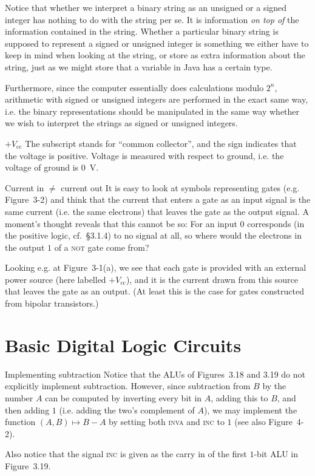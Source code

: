 \documentclass[article, a4paper, 11pt, oneside]{memoir}
\numberwithin{equation}{chapter}
\newcommand{\gate}{\textsc}
\newcommand{\gateNOT}{\gate{not}}
\newcounter{desccount}
\begin{document}
\begin{notelist}
Notice that whether we interpret a binary string as an unsigned or a signed integer has nothing to do with the string per se. It is information \emph{on top of} the information contained in the string. Whether a particular binary string is supposed to represent a signed or unsigned integer is something we either have to keep in mind when looking at the string, or store as extra information about the string, just as we might store that a variable in Java has a certain type.

Furthermore, since the computer essentially does calculations modulo $2^n$, arithmetic with signed or unsigned integers are performed in the exact same way, i.e. the binary representations should be manipulated in the same way whether we wish to interpret the strings as signed or unsigned integers.

\item[$+V_{\mathrm{cc}}$]
The subscript stands for \enquote{common collector}, and the sign indicates that the voltage is positive. Voltage is measured with respect to ground, i.e. the voltage of ground is \SI{0}{\volt}.

\item[Current in $\neq$ current out]\label{note:current-in-out} %
It is easy to look at symbols representing gates (e.g. Figure~3-2) and think that the current that enters a gate as an input signal is the same current (i.e. the same electrons) that leaves the gate as the output signal. A moment's thought reveals that this cannot be so: For an input $0$ corresponds (in the positive logic, cf.~§3.1.4) to no signal at all, so where would the electrons in the output $1$ of a \gateNOT{} gate come from?

Looking e.g. at Figure~3-1(a), we see that each gate is provided with an external power source (here labelled $+V_{\mathrm{cc}}$), and it is the current drawn from this source that leaves the gate as an output. (At least this is the case for gates constructed from bipolar transistors.)
\end{notelist}


\section{Basic Digital Logic Circuits}

\begin{notelist}
\item[Implementing subtraction]
Notice that the ALUs of Figures~3.18 and 3.19 do not explicitly implement subtraction. However, since subtraction from $B$ by the number $A$ can be computed by inverting every bit in $A$, adding this to $B$, and then adding $1$ (i.e. adding the two's complement of $A$), we may implement the function $(A,B) \mapsto B - A$ by setting both \textsc{inva} and \textsc{inc} to $1$ (see also Figure~4-2).

Also notice that the signal \textsc{inc} is given as the carry in of the first $1$-bit ALU in Figure~3.19.
\end{notelist}
\end{document}
